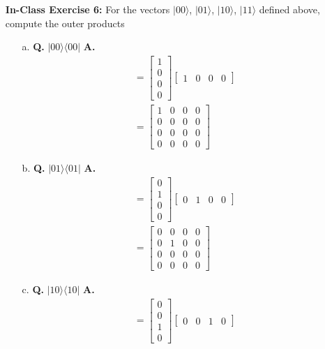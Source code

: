 \documentclass[main.tex]{subfiles}
\begin{document}
\begin{enumerate}
\item[] \textbf{In-Class Exercise 6:} For the vectors $|00\rangle$, $|01\rangle$, $|10\rangle$, $|11\rangle$ defined above, compute the outer products

    \begin{enumerate}
        \item[a.] \textbf{Q.} $|00\rangle\langle 00|$ \textbf{A.}
        \begin{align*}
            & = \left[\begin{array}{l} 1 \\ 0 \\ 0 \\ 0 \end{array}\right] \left[\begin{array}{llll} 1 & 0 & 0 & 0 \end{array}\right] \\
            & = \left[\begin{array}{llll} 1 & 0 & 0 & 0 \\ 0 & 0 & 0 & 0 \\ 0 & 0 & 0 & 0 \\ 0 & 0 & 0 & 0 \end{array}\right] 
        \end{align*}
        \item[b.] \textbf{Q.} $|01\rangle\langle 01|$ \textbf{A.}
        \begin{align*}
            & = \left[\begin{array}{l} 0 \\ 1 \\ 0 \\ 0 \end{array}\right] \left[\begin{array}{llll} 0 & 1 & 0 & 0 \end{array}\right] \\
            & = \left[\begin{array}{llll} 0 & 0 & 0 & 0 \\ 0 & 1 & 0 & 0 \\ 0 & 0 & 0 & 0 \\ 0 & 0 & 0 & 0 \end{array}\right] 
        \end{align*}
        \item[c.] \textbf{Q.} $|10\rangle\langle 10|$ \textbf{A.}
        \begin{align*}
            & = \left[\begin{array}{l} 0 \\ 0 \\ 1 \\ 0 \end{array}\right] \left[\begin{array}{llll} 0 & 0 & 1 & 0 \end{array}\right] \\

\end{align*}
\end{enumerate}
\end{enumerate}
\end{document}
